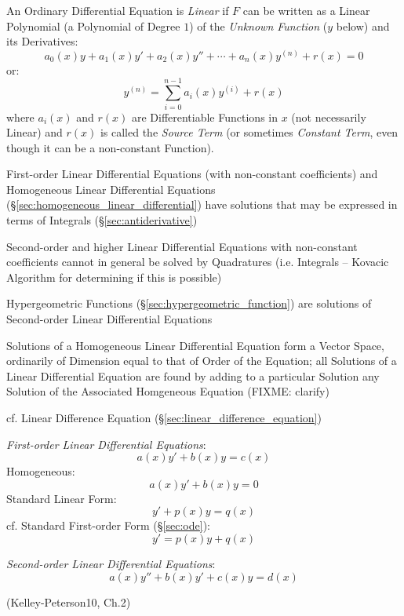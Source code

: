 An Ordinary Differential Equation is \emph{Linear} if $F$ can be written as a
Linear Polynomial (a Polynomial of Degree $1$) of the \emph{Unknown Function}
($y$ below) and its Derivatives:
\[
  a_0(x)y + a_1(x)y' + a_2(x)y'' + \cdots + a_n(x)y^{(n)} + r(x) = 0
\]
or:
\[
  y^{(n)} = \sum_{i=0}^{n-1} a_i(x) y^{(i)} + r(x)
\]
where $a_i(x)$ and $r(x)$ are Differentiable Functions in $x$ (not necessarily
Linear) and $r(x)$ is called the \emph{Source Term} (or sometimes
\emph{Constant Term}, even though it can be a non-constant Function).

First-order Linear Differential Equations (with non-constant coefficients) and
Homogeneous Linear Differential Equations
(\S\ref{sec:homogeneous_linear_differential}) have solutions that may
be expressed in terms of Integrals (\S\ref{sec:antiderivative})

Second-order and higher Linear Differential Equations with non-constant
coefficients cannot in general be solved by Quadratures (i.e. Integrals --
Kovacic Algorithm for determining if this is possible)

Hypergeometric Functions (\S\ref{sec:hypergeometric_function}) are solutions of
Second-order Linear Differential Equations

Solutions of a Homogeneous Linear Differential Equation form a Vector Space,
ordinarily of Dimension equal to that of Order of the Equation; all Solutions
of a Linear Differential Equation are found by adding to a particular Solution
any Solution of the Associated Homgeneous Equation (FIXME: clarify)

cf. Linear Difference Equation (\S\ref{sec:linear_difference_equation})

\emph{First-order Linear Differential Equations}:
\[
  a(x) y' + b(x) y = c(x)
\]
Homogeneous:
\[
  a(x) y' + b(x) y = 0
\]
Standard Linear Form:
\[
  y' + p(x) y = q(x)
\]
cf. Standard First-order Form (\S\ref{sec:ode}):
\[
  y' = p(x) y + q(x)
\]

\emph{Second-order Linear Differential Equations}:
\[
  a(x) y'' + b(x) y' + c(x) y = d(x)
\]

\asterism

(Kelley-Peterson10, Ch.2)

